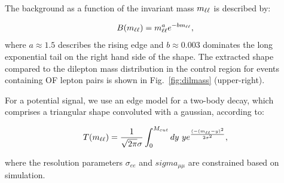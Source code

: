 The background as a function of the invariant mass $m_{\ell\ell}$ is described by:

\begin{equation}
B(m_{\ell\ell}) = m_{\ell\ell}^a e^{-b m_{\ell\ell}},
\end{equation}
where $a\approx1.5$ describes the rising edge and $b\approx0.003$
dominates the long exponential tail on the right hand side of the 
shape. The extracted shape compared to the dilepton mass distribution in the control region
for events containing OF lepton pairs is shown in Fig.~\ref{fig:dilmass} (upper-right).

For a potential signal, we use an edge model for a two-body decay, 
which comprises a triangular shape convoluted with a gaussian,
according to:

\begin{equation}
T(m_{\ell\ell}) = \frac{1}{\sqrt{2\pi}\sigma}\int_0^{M_{cut}} dy~y e^{\frac{(-(m_{\ell\ell}-y)^2}{2\sigma^2}},
\end{equation}

where the resolution parameters $\sigma_{ee}$ and $sigma_{\mu\mu}$ are constrained 
based on simulation.

